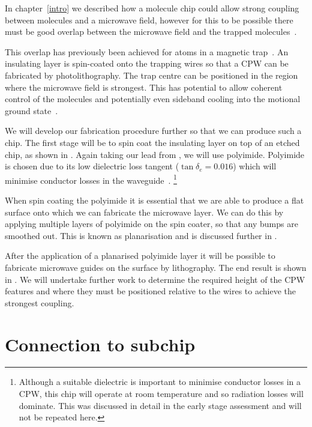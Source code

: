 In chapter~\ref{intro} 
we described how a molecule chip could allow strong coupling between \CaF{}
molecules and a microwave field, however for this to be possible there must be
good overlap between the microwave field and the trapped
molecules~\cite{Andre2006}.
%

This overlap has previously been achieved for atoms in a magnetic
trap~\cite{Treutlein2008}. An insulating layer is spin-coated onto the trapping
wires so that a CPW  can be fabricated by
photolithography. The trap centre can be positioned in the region where the
microwave field is strongest. This has potential to allow coherent control of
the molecules and potentially even sideband cooling into the motional ground
state~\cite{Andre2006}.
%

We will develop our fabrication procedure further so that we can produce such a
chip. The first stage will be to spin coat the insulating layer on top of an
etched chip, as shown in . Again taking our
lead from , we will use polyimide. Polyimide is chosen
due to its low dielectric loss tangent ($\tan\delta_e = 0.016$) which will
minimise conductor losses in the waveguide~\cite{Collin2007, Simons2004}.
\footnote{Although a suitable dielectric is important to minimise conductor
losses in a CPW, this chip will operate at room temperature and so radiation
losses will dominate. This was discussed in detail in the early stage
assessment and will not be repeated here.}
%

When spin coating the polyimide it is essential that we are able to produce a
flat surface onto which we can fabricate the microwave layer. We can do this by
applying multiple layers of polyimide on the spin coater, so that any bumps are
smoothed out. This is known as planarisation and is discussed further in
.

After the application of a planarised polyimide layer it will be possible to
fabricate microwave guides on the surface by lithography. The end result is
shown in . We will undertake further work to
determine the required height of the CPW features and where they must be
positioned relative to the wires to achieve the strongest coupling.

\section{Connection to subchip}

